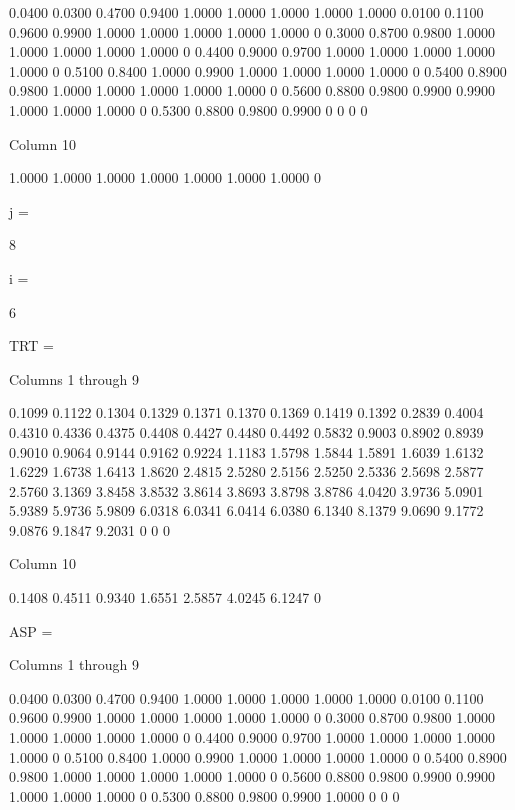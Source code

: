     0.0400    0.0300    0.4700    0.9400    1.0000    1.0000    1.0000    1.0000    1.0000
    0.0100    0.1100    0.9600    0.9900    1.0000    1.0000    1.0000    1.0000    1.0000
         0    0.3000    0.8700    0.9800    1.0000    1.0000    1.0000    1.0000    1.0000
         0    0.4400    0.9000    0.9700    1.0000    1.0000    1.0000    1.0000    1.0000
         0    0.5100    0.8400    1.0000    0.9900    1.0000    1.0000    1.0000    1.0000
         0    0.5400    0.8900    0.9800    1.0000    1.0000    1.0000    1.0000    1.0000
         0    0.5600    0.8800    0.9800    0.9900    0.9900    1.0000    1.0000    1.0000
         0    0.5300    0.8800    0.9800    0.9900         0         0         0         0

  Column 10

    1.0000
    1.0000
    1.0000
    1.0000
    1.0000
    1.0000
    1.0000
         0


j =

     8


i =

     6


TRT =

  Columns 1 through 9

    0.1099    0.1122    0.1304    0.1329    0.1371    0.1370    0.1369    0.1419    0.1392
    0.2839    0.4004    0.4310    0.4336    0.4375    0.4408    0.4427    0.4480    0.4492
    0.5832    0.9003    0.8902    0.8939    0.9010    0.9064    0.9144    0.9162    0.9224
    1.1183    1.5798    1.5844    1.5891    1.6039    1.6132    1.6229    1.6738    1.6413
    1.8620    2.4815    2.5280    2.5156    2.5250    2.5336    2.5698    2.5877    2.5760
    3.1369    3.8458    3.8532    3.8614    3.8693    3.8798    3.8786    4.0420    3.9736
    5.0901    5.9389    5.9736    5.9809    6.0318    6.0341    6.0414    6.0380    6.1340
    8.1379    9.0690    9.1772    9.0876    9.1847    9.2031         0         0         0

  Column 10

    0.1408
    0.4511
    0.9340
    1.6551
    2.5857
    4.0245
    6.1247
         0


ASP =

  Columns 1 through 9

    0.0400    0.0300    0.4700    0.9400    1.0000    1.0000    1.0000    1.0000    1.0000
    0.0100    0.1100    0.9600    0.9900    1.0000    1.0000    1.0000    1.0000    1.0000
         0    0.3000    0.8700    0.9800    1.0000    1.0000    1.0000    1.0000    1.0000
         0    0.4400    0.9000    0.9700    1.0000    1.0000    1.0000    1.0000    1.0000
         0    0.5100    0.8400    1.0000    0.9900    1.0000    1.0000    1.0000    1.0000
         0    0.5400    0.8900    0.9800    1.0000    1.0000    1.0000    1.0000    1.0000
         0    0.5600    0.8800    0.9800    0.9900    0.9900    1.0000    1.0000    1.0000
         0    0.5300    0.8800    0.9800    0.9900    1.0000         0         0         0


